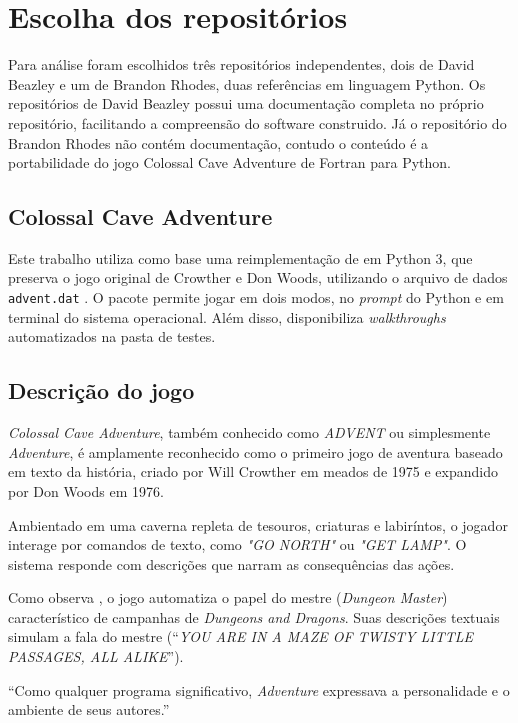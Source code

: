 \documentclass[12pt,a4paper]{article}
\begin{document}
\section{Escolha dos repositórios}
Para análise foram escolhidos três repositórios independentes, dois de David Beazley e um de Brandon Rhodes, duas referências em linguagem Python. Os repositórios de David Beazley possui uma documentação completa no próprio repositório, facilitando a compreensão do software construido. Já o repositório do Brandon Rhodes não contém documentação, contudo o conteúdo é a portabilidade do jogo Colossal Cave Adventure de Fortran para Python.

\subsection{Colossal Cave Adventure}
Este trabalho utiliza como base uma reimplementação de \textcite{rhodes_adventure_py} em Python 3, que preserva o jogo original de Crowther e Don Woods, utilizando o arquivo de dados \texttt{advent.dat} \textcite{adventure_original_sources}. O pacote permite jogar em dois modos, no \emph{prompt} do Python e em terminal do sistema operacional. Além disso, disponibiliza \textit{walkthroughs} automatizados na pasta de testes.

\subsection{Descrição do jogo}

\textit{Colossal Cave Adventure}, também conhecido como \textit{ADVENT} ou simplesmente \textit{Adventure}, é amplamente reconhecido como o primeiro jogo de aventura baseado em texto da história, criado por Will Crowther em meados de 1975 e expandido por Don Woods em 1976. 

Ambientado em uma caverna repleta de tesouros, criaturas e labiríntos, o jogador interage por comandos de texto, como \textit{"GO NORTH"} ou \textit{"GET LAMP"}. O sistema responde com descrições que narram as consequências das ações.

Como observa \textcite{dibbell1998mytinylife}, o jogo automatiza o papel do mestre (\textit{Dungeon Master}) característico de campanhas de \textit{Dungeons and Dragons}. Suas descrições textuais simulam a fala do mestre (“\textit{YOU ARE IN A MAZE OF TWISTY LITTLE PASSAGES, ALL ALIKE}”).  

“Como qualquer programa significativo, \textit{Adventure} expressava a personalidade e o ambiente de seus autores.” \textcite{levy2010hackers}
\end{document}
